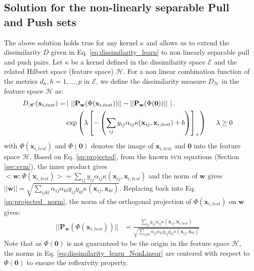 \subsection{Solution for the non-linearly separable Pull and Push sets}
The above solution holds true for any kernel $\kappa$ and allows us to extend the dissimilarity $D$ given in Eq. \ref{eq:dissimilarity_learn} to non linearly separable pull and push pairs. Let $\kappa$ be a kernel defined in the dissimilarity space $\mathcal{E}$ and the related Hilbert space (feature space) $\mathcal{H}$. For a non linear combination function of the metrics $d_h, h = 1,\ldots,p$ in $\mathcal{E}$, we define the dissimilarity measure $D_\mathcal{H}$ in the feature space $\mathcal{H}$ as:
\begin{equation}
\begin{aligned}
D_\mathcal{H}(\textbf{x}_{i,test}) = 
& \left| \textbf{ }||\textbf{P}_\textbf{w}(\Phi(\textbf{x}_{i,test}))||-||\textbf{P}_\textbf{w}(\Phi(\textbf{0}))|| \textbf{ } \right|   . \\
& \exp\left( \lambda \left[  -\left( \sum_{ij}y_{ij} \alpha_{ij} \kappa(\textbf{x}_{ij},\textbf{x}_{i,test}) + b \right)  \right] _+\right) 
\text{ \quad  } \lambda \geq 0
\label{eq:dissimilarity_learn_NonLinear}
\end{aligned}
\end{equation}
\noindent with $\Phi(\textbf{x}_{i,test})$ and $\Phi(\textbf{0})$ denotes the image of $\textbf{x}_{i,test}$ and $\textbf{0}$ into the feature space $\mathcal{H}$. Based on Eq. \ref{eq:projected}, from the known \textsc{svm} equations (Section \ref{sec:svm}), the inner product gives $<\textbf{w};\Phi(\textbf{x}_{i,test})> = \sum_{ij} y_{ij} \alpha_{ij} \kappa(\textbf{x}_{ij},\textbf{x}_{i,test})$ and the norm of $\textbf{w}$ gives $||\textbf{w}||= \sqrt{\sum_{ijkl} \alpha_{ij} \alpha_{kl} y_{ij} y_{kl} \kappa(\textbf{x}_{ij},\textbf{x}_{kl})}$. Replacing back into Eq. \ref{eq:projected_norm}, the norm of the orthogonal projection of $\Phi(\textbf{x}_{i,test})$ on $\textbf{w}$ gives:
\begin{align}
||\textbf{P}_\textbf{w}(\Phi(\textbf{x}_{i,test}))|| & = \frac
{\sum_{ij} y_{ij} \alpha_{ij} \kappa(\textbf{x}_{ij},\textbf{x}_{i,test})}
{\sqrt{\sum_{ijkl} \alpha_{ij} \alpha_{kl} y_{ij} y_{kl}
		\kappa(\textbf{x}_{ij},\textbf{x}_{kl})
	}}
\end{align}
Note that as $\Phi(\textbf{0})$ is not guaranteed to be the origin in the feature space $\mathcal{H}$, the norms in Eq. \ref{eq:dissimilarity_learn_NonLinear} are centered with respect to $\Phi(\textbf{0})$ to ensure the reflexivity property. 
